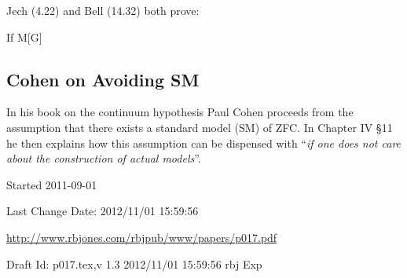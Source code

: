 \documentclass[10pt,titlepage]{article}
\begin{document}
Jech \cite{jech2002} (4.22) and Bell \cite{bell2005} (14.32) both prove:

If M[G]



\appendix

\subsection{Cohen on Avoiding SM}

In his book on the continuum hypothesis\cite{cohenSTCH} Paul Cohen proceeds from the assumption that there exists a standard model (SM) of ZFC.
In Chapter IV \S 11 he then explains how this assumption can be dispensed with ``\emph{if one does not care about the construction of actual models}''.






\label{index}
{\twocolumn[]
{\small\printindex}}

\vfill

\tiny{
Started 2011-09-01

Last Change $ $Date: 2012/11/01 15:59:56 $ $

\href{http://www.rbjones.com/rbjpub/www/papers/p017.pdf}{http://www.rbjones.com/rbjpub/www/papers/p017.pdf}

Draft $ $Id: p017.tex,v 1.3 2012/11/01 15:59:56 rbj Exp $ $
}%
\end{document}
